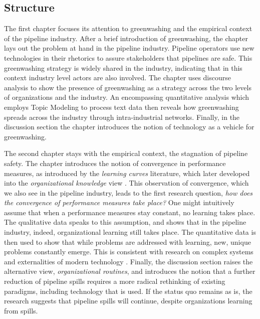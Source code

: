\subsection{Structure}

The first chapter focuses its attention to greenwashing and the empirical context of the pipeline industry. After a brief introduction of greenwashing, the chapter lays out the problem at hand in the pipeline industry. Pipeline operators use new technologies in their rhetorics to assure stakeholders that pipelines are safe. This greenwashing strategy is widely shared in the industry, indicating that in this context industry level actors are also involved. The chapter uses discourse analysis to show the presence of greenwashing as a strategy across the two levels of organizations and the industry. An encompassing quantitative analysis which employs Topic Modeling to process text data \citep{Hannigan2019} then reveals how greenwashing spreads across the industry through intra-industrial networks. Finally, in the discussion section the chapter introduces the notion of technology as a vehicle for greenwashing. %

The second chapter stays with the empirical context, the stagnation of pipeline safety. The chapter introduces the notion of convergence in performance measures, as introduced by the \textit{learning curves} literature, which later developed into the \textit{organizational knowledge} view \citep{Argote2013-1}. This observation of convergence, which we also see in the pipeline industry, leads to the first research question, \textit{how does the convergence of performance measures take place?} One might intuitively assume that when a performance measures stay constant, no learning takes place. The qualitative data speaks to this assumption, and shows that in the pipeline industry, indeed, organizational learning still takes place. The quantitative data is then used to show that while problems are addressed with learning, new, unique problems constantly emerge. This is consistent with research on complex systems and externalities of modern technology \citep{Beck1992, Perrow1984}. Finally, the discussion section raises the alternative view, \textit{organizational routines}, and introduces the notion that a further reduction of pipeline spills requires a more radical rethinking of existing paradigms, including technology that is used. If the status quo remains as is, the research suggests that pipeline spills will continue, despite organizations learning from spills.

